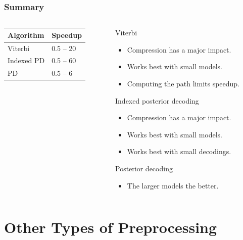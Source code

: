 \documentclass[english,notes]{beamer}
\begin{document}
\begin{frame}
  \frametitle{Summary}
  \begin{columns}
    \begin{column}{0.4\textwidth}
      \begin{table}
        \centering
        \begin{tabular}{ll}
          \toprule
          Algorithm & Speedup \\
          \midrule
          Viterbi & 0.5 -- 20\\
          Indexed PD & 0.5 -- 60\\
          PD & 0.5 -- 6\\
          \bottomrule
        \end{tabular}
      \end{table}
    \end{column}    \pause%
    \begin{column}{0.6\textwidth}
      \begin{block}{Viterbi}
        \begin{itemize}
        \item Compression has a major impact.
        \item Works best with small models.
        \item Computing the path limits speedup.
        \end{itemize}
      \end{block}
      \begin{block}{Indexed posterior decoding}
        \begin{itemize}
        \item Compression has a major impact.
        \item Works best with small models.
        \item Works best with small decodings.
        \end{itemize}
      \end{block}
      \begin{block}{Posterior decoding}
        \begin{itemize}
        \item The larger models the better.
        \end{itemize}
      \end{block}
    \end{column}
  \end{columns}
\end{frame}

\section{Other Types of Preprocessing}
\end{document}
